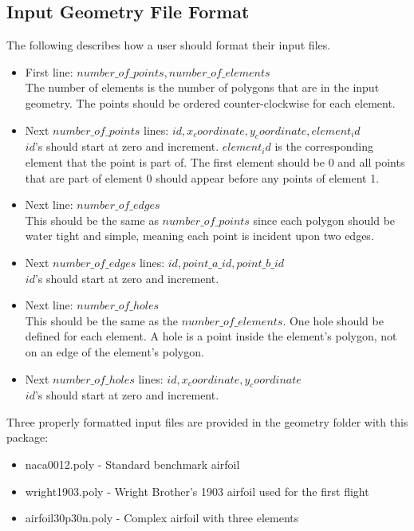 \documentclass[manuscript, screen]{acmart}
\begin{document}
\subsection{Input Geometry File Format}
The following describes how a user should format their input files. 
\begin{itemize}
\item First line: $number\_of\_points, number\_of\_elements$\\
The number of elements is the number of polygons that are in the input geometry. The points should be ordered counter-clockwise for each element.
\item Next $number\_of\_points$ lines: $id, x_coordinate, y_coordinate, element_id$\\
$id$'s should start at zero and increment. $element_id$ is the corresponding element that the point is part of. The first element should be 0 and all points that are part of element 0 should appear before any points of element 1.
\item Next line: $number\_of\_edges$\\
This should be the same as $number\_of\_points$ since each polygon should be water tight and simple, meaning each point is incident upon two edges.
\item Next $number\_of\_edges$ lines: $id, point\_a\_id, point\_b\_id$\\
$id$'s should start at zero and increment. 
\item Next line: $number\_of\_holes$\\
This should be the same as the $number\_of\_elements$. One hole should be defined for each element. A hole is a point inside the element's polygon, not on an edge of the element's polygon.
\item Next $number\_of\_holes$ lines: $id, x_coordinate, y_coordinate$\\
$id$'s should start at zero and increment.
\end{itemize}

Three properly formatted input files are provided in the geometry folder with this package:
\begin{itemize}
\item naca0012.poly - Standard benchmark airfoil
\item wright1903.poly - Wright Brother's 1903 airfoil used for the first flight
\item airfoil30p30n.poly - Complex airfoil with three elements
\end{itemize}
\end{document}
